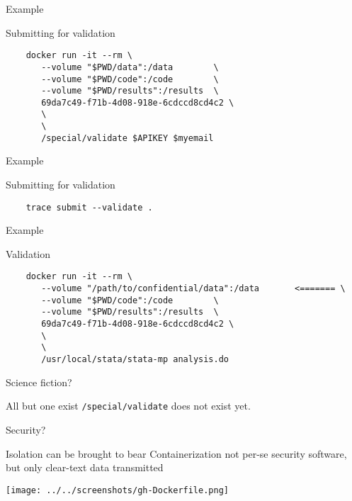 \begin{frame}[fragile]{Example}
\begin{block}{Submitting for validation}
	 {\footnotesize
	\begin{verbatim}
	docker run -it --rm \
       --volume "$PWD/data":/data        \
       --volume "$PWD/code":/code        \ 
       --volume "$PWD/results":/results  \
       69da7c49-f71b-4d08-918e-6cdccd8cd4c2 \
       \
       \
       /special/validate $APIKEY $myemail
	\end{verbatim}
 }
\end{block}
\end{frame}

\begin{frame}[fragile]{Example}
\begin{block}{Submitting for validation}
	 {\footnotesize
	\begin{verbatim}
	trace submit --validate .
	\end{verbatim}
 }
\end{block}
\end{frame}

\begin{frame}[fragile]{Example}
\begin{block}{Validation}
	 {\footnotesize
	\begin{verbatim}
	docker run -it --rm \
       --volume "/path/to/confidential/data":/data       <======= \
       --volume "$PWD/code":/code        \ 
       --volume "$PWD/results":/results  \
       69da7c49-f71b-4d08-918e-6cdccd8cd4c2 \
       \
       \
       /usr/local/stata/stata-mp analysis.do
	\end{verbatim}
 }
\end{block}
\end{frame}



\begin{frame}{Science fiction?}
\begin{block}{All but one exist}
\texttt{/special/validate} does not exist yet.
\end{block}
\end{frame}

\begin{frame}{Security?}
\begin{block}{Isolation can be brought to bear}
Containerization not per-se security software, but only clear-text data transmitted
\end{block}
\texttt{[image: ../../screenshots/gh-Dockerfile.png]}
\end{frame}



